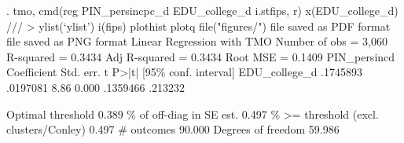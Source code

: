 . tmo, cmd(reg PIN_persincpc_d EDU_college_d i.stfips, r) x(EDU_college_d) ///
>     ylist(`ylist') i(fips) plothist plotq file("figures/")
file{} saved as PDF format
file{} saved as PNG format
{\smallskip}
Linear Regression with TMO                              Number of obs =  3,060
                                                        R-squared     = 0.3434
                                                        Adj R-squared = 0.3434
                                                        Root MSE      = 0.1409
{\smallskip}
PIN_persinc{\tytilde}d {\VBAR} Coefficient  Std. err.      t    P>|t|     [95\% conf. interval]
EDU_college_d {\VBAR}   .1745893   .0197081     8.86   0.000     .1359466     .213232
                                                                               
                                                   Optimal threshold      0.389
                                            \% of off-diag in SE est.      0.497
                              \% >= threshold (excl. clusters/Conley)      0.497
                                                          \# outcomes     90.000
                                                  Degrees of freedom     59.986
